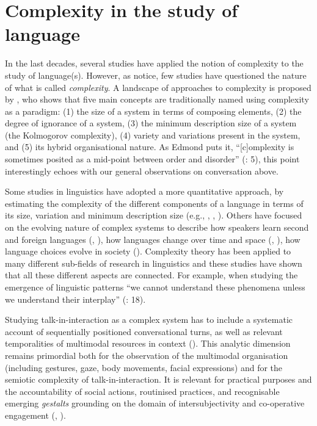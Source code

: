 \documentclass[output=paper]{langscibook}
\begin{document}
\section{Complexity in the study of language}\label{sec:12:1}\largerpage

In the last decades, several studies have applied the notion of complexity to the study of language(s). However, as \citet{MufweneEtAl2016} notice, few studies have questioned the nature of what is called \textit{complexity}. A landscape of approaches to complexity is proposed by \citet{Edmonds1999}, who shows that five main concepts are traditionally named using complexity as a paradigm:
(1) the size of a system in terms of composing elements,
(2) the degree of ignorance of a system,
(3) the minimum description size of a system (the Kolmogorov complexity),
(4) variety and variations present in the system, and
(5) its hybrid organisational nature. As Edmond puts it, “[c]omplexity is sometimes posited as a mid-point between order and disorder” (\citeyear{Edmond1999}: 5), this point interestingly echoes with our general observations on conversation above.

Some studies in linguistics have adopted a more quantitative approach, by estimating the complexity of the different components of a language in terms of its size, variation and minimum description size (e.g., \citealt{NewmeyerPreston2004}, \citealt{AckermanMalouf2013}, \citealt{Bisang2014}). Others have focused on the evolving nature of complex systems to describe how speakers learn second and foreign languages (\citealt{Oxford2017}, \citealt{OxfordEtAl2018}), how languages change over time and space (\citealt{Kusters2008}, \citealt{DeGroot2008}), how language choices evolve in society (\citealt{Loureiro-PortoSanMiguel2016}). Complexity theory has been applied to many different sub-fields of research in linguistics and these studies have shown that all these different aspects are connected. For example, when studying the emergence of linguistic patterns “we cannot understand these phenomena unless we understand their interplay” (\citealt{BecknerEtAl2009}: 18).

Studying talk-in-interaction as a complex system has to include a systematic account of sequentially positioned conversational turns, as well as relevant temporalities of multimodal resources in context (\citealt{DeppermannGünthner2015}). This analytic dimension remains primordial both for the observation of the multimodal organisation (including gestures, gaze, body movements, facial expressions) and for the semiotic complexity of talk-in-interaction. It is relevant for practical purposes and the accountability of social actions, routinised practices, and recognisable emerging \textit{gestalts} grounding on the domain of intersubjectivity and co-operative engagement (\citealt{Levinson2013}, \citealt{Goodwin2018}).
\end{document}
